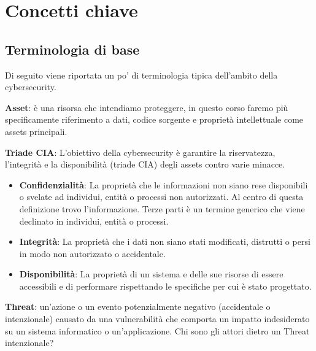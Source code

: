 \chapter{Concetti chiave}
\section{Terminologia di base}
Di seguito viene riportata un po' di terminologia tipica dell'ambito della 
cybersecurity.

\textbf{Asset}: è una risorsa che intendiamo proteggere, in questo corso faremo
più specificamente riferimento a dati, codice sorgente e proprietà intellettuale
come assets principali.

\textbf{Triade CIA}: L'obiettivo della cybersecurity è garantire la riservatezza,
l'integrità e la disponibilità (triade CIA) degli assets contro varie minacce.

\begin{itemize}
    \item \textbf{Confidenzialità}: La proprietà che le informazioni non siano rese
    disponibili o svelate ad individui, entità o processi non autorizzati. Al
    centro di questa definizione trovo l'informazione. Terze parti è un termine generico che
    viene declinato in individui, entità o processi.
    \item \textbf{Integrità}: La proprietà che i dati non siano stati modificati, distrutti
    o persi in modo non autorizzato o accidentale.
    \item \textbf{Disponibilità}: La proprietà di un sistema e delle sue risorse di essere 
    accessibili e di performare rispettando le specifiche per cui è stato progettato.
\end{itemize}

\textbf{Threat}: un'azione o un evento potenzialmente negativo (accidentale o 
intenzionale) causato da una vulnerabilità che comporta un impatto indesiderato
su un sistema informatico o un'applicazione. Chi sono gli attori dietro un Threat
intenzionale?

